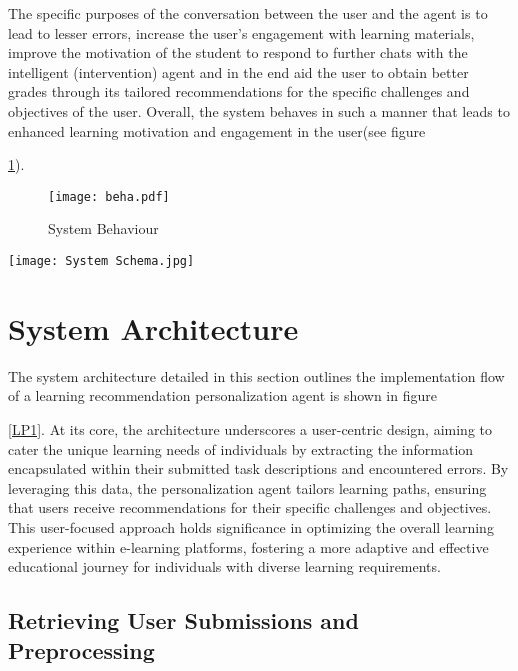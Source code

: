 \documentclass[conference]{IEEEtran}
\begin{document}
The specific purposes of the conversation between the user and the agent is to lead to lesser errors, increase the user's engagement with learning materials, improve the motivation of the student to respond to further chats with the intelligent (intervention) agent and in the end aid the user to obtain better grades through its tailored recommendations for the specific challenges and objectives of the user. Overall, the system behaves in such a manner that leads to enhanced learning motivation and engagement in the user(see figure {\ref{LP3}).

\begin{figure}[!ht] %
\centering
\texttt{[image: beha.pdf]}
\caption{System Behaviour}
\label{LP3}
\end{figure}

\begin{figure*}[!bt] %
\centering
\texttt{[image: System Schema.jpg]}
\caption{System Schematic of the learning recommendation agent}
\label{LP1}
\end{figure*}


\section{{System Architecture}}

The system architecture detailed in this section outlines the implementation flow of a learning recommendation personalization agent is shown in figure {\ref{LP1}. At its core, the architecture underscores a user-centric design, aiming to cater the unique learning needs of individuals by extracting the information encapsulated within their submitted task descriptions and encountered errors. By leveraging this data, the personalization agent tailors learning paths, ensuring that users receive recommendations for their specific challenges and objectives. This user-focused approach holds significance in optimizing the overall learning experience within e-learning platforms, fostering a more adaptive and effective educational journey for individuals with diverse learning requirements.




\subsection{Retrieving User Submissions and Preprocessing}

}}
\end{document}
